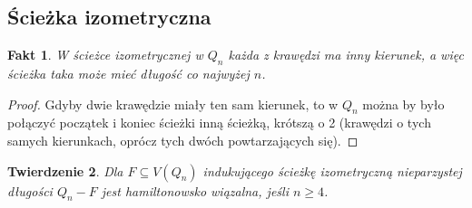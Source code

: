 \documentclass{pracamgr}
\newtheorem{theorem}{Twierdzenie}[chapter]
\newtheorem{fact}[theorem]{Fakt}
\begin{document}
   \subsection{Ścieżka izometryczna}
    \begin{fact}\label{sciezka izo - rozne kierunki}
     W ścieżce izometrycznej w $Q_n$ każda z krawędzi ma inny kierunek, a więc ścieżka taka może mieć długość co najwyżej $n$.
    \end{fact}
    \begin{proof}
     Gdyby dwie krawędzie miały ten sam kierunek, to w $Q_n$ można by było połączyć początek i koniec ścieżki inną ścieżką, krótszą o 2
     (krawędzi o tych samych kierunkach, oprócz tych dwóch powtarzających się).
    \end{proof}
    \begin{theorem}\label{hamilton - sciezka, nieparz}
     Dla $F\subseteq V(Q_n)$ indukującego ścieżkę izometryczną nieparzystej długości $Q_n-F$ jest hamiltonowsko wiązalna, jeśli $n\ge4$.
    \end{theorem}
\end{document}
